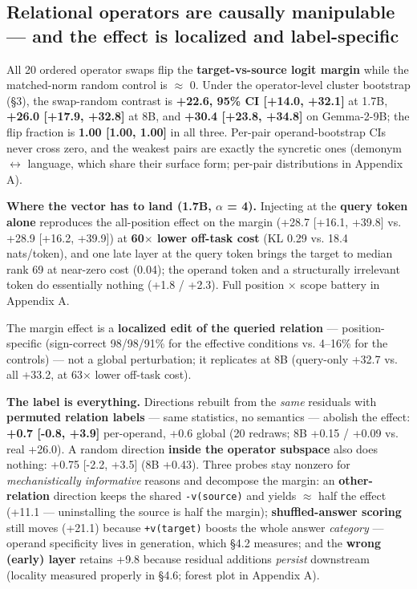 \subsection{Relational operators are causally manipulable --- and
the effect is localized and
label-specific}

All 20 ordered operator swaps flip the \textbf{target-vs-source logit
margin} while the matched-norm random control is \ensuremath{\approx} 0. Under the
operator-level cluster bootstrap (\S{}3), the swap-random contrast is
\textbf{+22.6, 95\% CI {[}+14.0, +32.1{]}} at 1.7B, \textbf{+26.0
{[}+17.9, +32.8{]}} at 8B, and \textbf{+30.4 {[}+23.8, +34.8{]}} on
Gemma-2-9B; the flip fraction is \textbf{1.00 {[}1.00, 1.00{]}} in all
three. Per-pair operand-bootstrap CIs never cross zero, and the weakest
pairs are exactly the syncretic ones (demonym \ensuremath{\leftrightarrow} language, which share
their surface form; per-pair distributions in Appendix A).

\textbf{Where the vector has to land (1.7B, \ensuremath{\alpha} = 4).} Injecting at the
\textbf{query token alone} reproduces the all-position effect on the
margin (+28.7 {[}+16.1, +39.8{]} vs. +28.9 {[}+16.2, +39.9{]}) at
\textbf{60\ensuremath{\times} lower off-task cost} (KL 0.29 vs. 18.4 nats/token), and one
late layer at the query token brings the target to median rank 69 at
near-zero cost (0.04); the operand token and a structurally irrelevant
token do essentially nothing (+1.8 / +2.3). Full position \ensuremath{\times} scope
battery in Appendix A.

The margin effect is a \textbf{localized edit of the queried relation}
--- position-specific (sign-correct 98/98/91\% for the effective
conditions vs. 4--16\% for the controls) --- not a global perturbation;
it replicates at 8B (query-only +32.7 vs. all +33.2, at 63\ensuremath{\times} lower
off-task cost).

\textbf{The label is everything.} Directions rebuilt from the
\emph{same} residuals with \textbf{permuted relation labels} --- same
statistics, no semantics --- abolish the effect: \textbf{+0.7 {[}-0.8,
+3.9{]}} per-operand, +0.6 global (20 redraws; 8B +0.15 / +0.09 vs. real
+26.0). A random direction \textbf{inside the operator subspace} also
does nothing: +0.75 {[}-2.2, +3.5{]} (8B +0.43). Three probes stay
nonzero for \emph{mechanistically informative} reasons and decompose the
margin: an \textbf{other-relation} direction keeps the shared
\texttt{-v(source)} and yields \ensuremath{\approx} half the effect (+11.1 --- uninstalling
the source is half the margin); \textbf{shuffled-answer scoring} still
moves (+21.1) because \texttt{+v(target)} boosts the whole answer
\emph{category} --- operand specificity lives in generation, which \S{}4.2
measures; and the \textbf{wrong (early) layer} retains +9.8 because
residual additions \emph{persist} downstream (locality measured properly
in \S{}4.6; forest plot in Appendix A).

